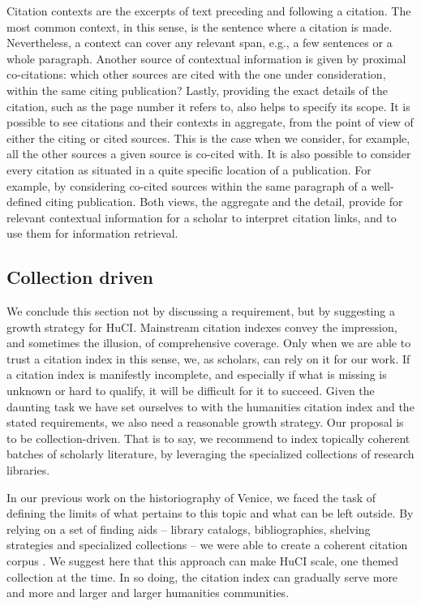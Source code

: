 Citation contexts are the excerpts of text preceding and following a citation. The most common context, in this sense, is the sentence where a citation is made. Nevertheless, a context can cover any relevant span, e.g., a few sentences or a whole paragraph. Another source of contextual information is given by proximal co-citations: which other sources are cited with the one under consideration, within the same citing publication? Lastly, providing the exact details of the citation, such as the page number it refers to, also helps to specify its scope. It is possible to see citations and their contexts in aggregate, from the point of view of either the citing or cited sources. This is the case when we consider, for example, all the other sources a given source is co-cited with. It is also possible to consider every citation as situated in a quite specific location of a publication. For example, by considering co-cited sources within the same paragraph of a well-defined citing publication. Both views, the aggregate and the detail, provide for relevant contextual information for a scholar to interpret citation links, and to use them for information retrieval.

\subsection{Collection driven}
We conclude this section not by discussing a requirement, but by suggesting a growth strategy for HuCI. Mainstream citation indexes convey the impression, and sometimes the illusion, of comprehensive coverage. Only when we are able to trust a citation index in this sense, we, as scholars, can rely on it for our work. If a citation index is manifestly incomplete, and especially if what is missing is unknown or hard to qualify, it will be difficult for it to succeed. Given the daunting task we have set ourselves to with the humanities citation index and the stated requirements, we also need a reasonable growth strategy. Our proposal is to be collection-driven. That is to say, we recommend to index topically coherent batches of scholarly literature, by leveraging the specialized collections of research libraries.
 
In our previous work on the historiography of Venice, we faced the task of defining the limits of what pertains to this topic and what can be left outside. By relying on a set of finding aids – library catalogs, bibliographies, shelving strategies and specialized collections – we were able to create a coherent citation corpus \cite{colavizza_references_2018}. We suggest here that this approach can make HuCI scale, one themed collection at the time. In so doing, the citation index can gradually serve more and more and larger and larger humanities communities.

